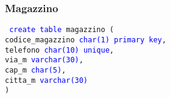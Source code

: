 \documentclass{article}
\begin{document}
    \subsubsection{Magazzino}
    \begin{flushleft}
        \texttt{
        \textcolor{blue}{create table} magazzino ( \\
        \hspace*{2em} codice\_magazzino \hspace*{0.4em} \textcolor{blue}{char(1)} \hspace*{4em} \textcolor{blue}{primary key}, \\
        \hspace*{2em} telefono \hspace*{4.3em} \textcolor{blue}{char(10)} \hspace*{3.5em} \textcolor{blue}{unique}, \\
        \hspace*{2em} via\_m \hspace*{6em} \textcolor{blue}{varchar(30)}, \\
        \hspace*{2em} cap\_m \hspace*{6em} \textcolor{blue}{char(5)}, \\
        \hspace*{2em} citta\_m \hspace*{5em} \textcolor{blue}{varchar(30)} \\)}
    \end{flushleft}
\end{document}
